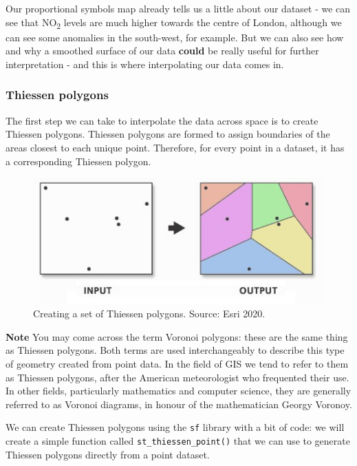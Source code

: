 \documentclass[
]{book}
\begin{document}
Our proportional symbols map already tells us a little about our dataset - we can see that NO\textsubscript{2} levels are much higher towards the centre of London, although we can see some anomalies in the south-west, for example. But we can also see how and why a smoothed surface of our data \textbf{could} be really useful for further interpretation - and this is where interpolating our data comes in.

\hypertarget{thiessen-polygons}{%
\subsubsection{Thiessen polygons}\label{thiessen-polygons}}

The first step we can take to interpolate the data across space is to create Thiessen polygons. Thiessen polygons are formed to assign boundaries of the areas closest to each unique point. Therefore, for every point in a dataset, it has a corresponding Thiessen polygon.

\begin{figure}

{\centering \includegraphics[width=550pt]{images/w09/thiessen} 

}

\caption{Creating a set of Thiessen polygons. Source: Esri 2020.}\label{fig:09-thiessen}
\end{figure}

\textbf{Note}
You may come across the term Voronoi polygons: these are the same thing as Thiessen polygons. Both terms are used interchangeably to describe this type of geometry created from point data. In the field of GIS we tend to refer to them as Thiessen polygons, after the American meteorologist who frequented their use. In other fields, particularly mathematics and computer science, they are generally referred to as Voronoi diagrams, in honour of the mathematician Georgy Voronoy.

We can create Thiessen polygons using the \texttt{sf} library with a bit of code: we will create a simple function called \texttt{st\_thiessen\_point()} that we can use to generate Thiessen polygons directly from a point dataset.
\end{document}
